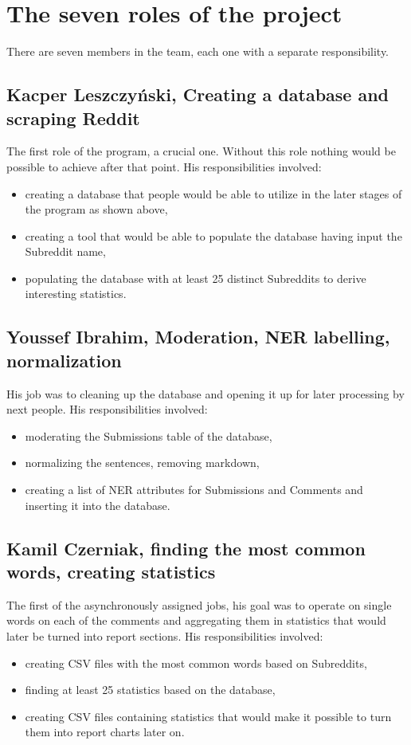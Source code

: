 \documentclass{article}
\begin{document}
\section{The seven roles of the project}
There are seven members in the team, each one with a separate responsibility.
\subsection{Kacper Leszczyński, Creating a database and scraping Reddit}
The first role of the program, a crucial one. Without this role nothing would be possible to achieve after that point. His responsibilities involved:
\begin{itemize}
	\item creating a database that people would be able to utilize in the later stages of the program as shown above,
	\item creating a tool that would be able to populate the database having input the Subreddit name,
	\item populating the database with at least 25 distinct Subreddits to derive interesting statistics.
\end{itemize}
\subsection{Youssef Ibrahim, Moderation, NER labelling, normalization}
His job was to cleaning up the database and opening it up for later processing by next people. His responsibilities involved:
\begin{itemize}
	\item moderating the Submissions table of the database,
	\item normalizing the sentences, removing markdown,
	\item creating a list of NER attributes for Submissions and Comments and inserting it into the database.
\end{itemize}
\subsection{Kamil Czerniak, finding the most common words, creating statistics}
The first of the asynchronously assigned jobs, his goal was to operate on single words on each of the comments and aggregating them in statistics that would later be turned into report sections. His responsibilities involved:
\begin{itemize}
	\item creating CSV files with the most common words based on Subreddits,
	\item finding at least 25 statistics based on the database,
	\item creating CSV files containing statistics that would make it possible to turn them into report charts later on.
\end{itemize}
\end{document}
